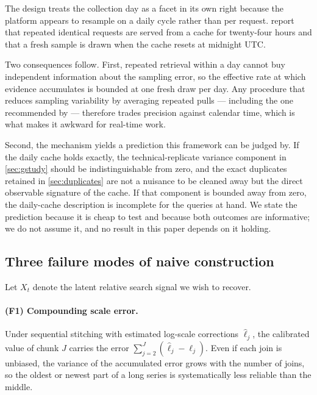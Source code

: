 \documentclass[12pt,a4paper,oneside]{article}
\begin{document}
\begin{remark}\label{rem:cache}
The design treats the collection day as a facet in its own right because the
platform appears to resample on a daily cycle rather than per request.
\citet{Djorno2026} report that repeated identical requests are served from a
cache for twenty-four hours and that a fresh sample is drawn when the cache
resets at midnight UTC.

Two consequences follow. First, repeated retrieval within a day cannot buy
independent information about the sampling error, so the effective rate at which
evidence accumulates is bounded at one fresh draw per day. Any procedure that
reduces sampling variability by averaging repeated pulls --- including the one
recommended by \citet{EichenauerIMS2022} --- therefore trades precision against
calendar time, which is what makes it awkward for real-time work.

Second, the mechanism yields a prediction this framework can be judged by. If the
daily cache holds exactly, the technical-replicate variance component in
\cref{sec:gstudy} should be indistinguishable from zero, and the exact
duplicates retained in \cref{sec:duplicates} are not a nuisance to be cleaned
away but the direct observable signature of the cache. If that component is
bounded away from zero, the daily-cache description is incomplete for the
queries at hand. We state the prediction because it is cheap to test and because
both outcomes are informative; we do not assume it, and no result in this paper
depends on it holding.
\end{remark}

\subsection{Three failure modes of naive construction}

Let $X_t$ denote the latent relative search signal we wish to recover.

\paragraph{(F1) Compounding scale error.} Under sequential stitching with
estimated log-scale corrections $\hat{\ell}_j$, the calibrated value of chunk $J$
carries the error $\sum_{j=2}^{J}(\hat{\ell}_j - \ell_j)$. Even if each join is
unbiased, the variance of the accumulated error grows with the number of joins,
so the oldest or newest part of a long series is systematically less reliable
than the middle.
\end{document}
